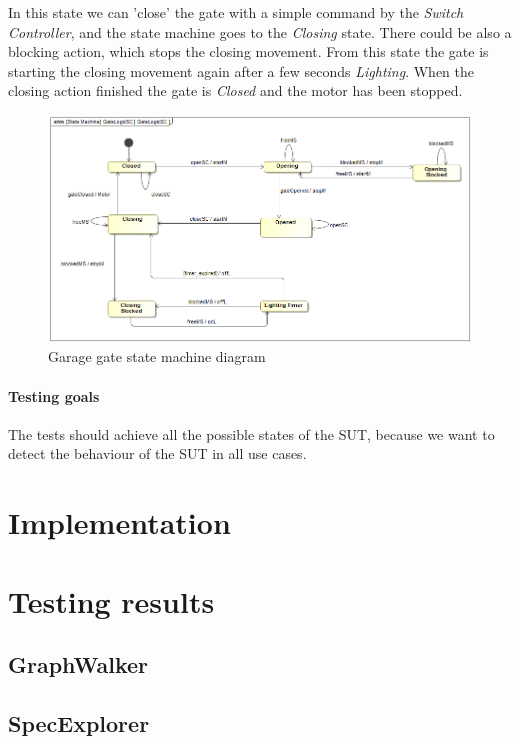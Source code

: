 In this state we can 'close' the gate with a simple command by the \textit{Switch Controller}, and the state machine goes to the \textit{Closing} state. There could be also a blocking action, which stops the closing movement. From this state the gate is starting the closing movement again after a few seconds \textit{Lighting}. When the closing action finished the gate is \textit{Closed} and the motor has been stopped.

\begin{figure}[!ht]
\centering
\includegraphics[width=150mm, keepaspectratio]{figures/magicDraw/GateLogicSC.png}
\caption{Garage gate state machine diagram}
\label{fig:Garage Statemachine}
\end{figure}

\paragraph{Testing goals}
The tests should achieve all the possible states of the SUT, because we want to detect the behaviour of the SUT in all use cases.

\section{Implementation}

\section{Testing results}
\subsection{GraphWalker}

\subsection{SpecExplorer}